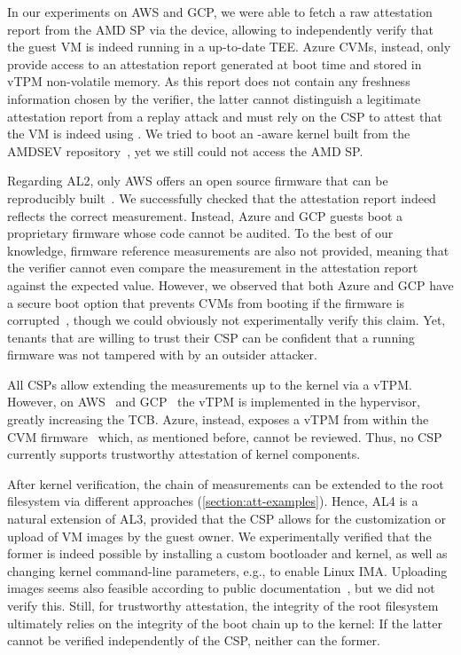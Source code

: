 In our experiments on \ac{AWS} and \ac{GCP}, we were able to fetch a raw
attestation report from the AMD \ac{SP} via the \sevguest{} device, allowing to
independently verify that the guest VM is indeed running in a up-to-date
\sevsnp{} \ac{TEE}. Azure \acp{CVM}, instead, only provide access to an
attestation report generated at boot time and stored in \ac{vTPM} non-volatile
memory. As this report does not contain any freshness information chosen by the
verifier, the latter cannot distinguish a legitimate attestation report from a
replay attack and must rely on the \ac{CSP} to attest that the VM is indeed
using \sevsnp. We tried to boot an \snp{}-aware kernel built from the AMDSEV
repository~\cite{amdsevGithub}, yet we still could not access the AMD \ac{SP}.

Regarding AL2, only \ac{AWS} offers an open source firmware that can be
reproducibly built~\cite{awsUefi}. We successfully checked that the attestation
report indeed reflects the correct measurement. Instead, Azure and \ac{GCP}
guests boot a proprietary firmware whose code cannot be audited. To the best of
our knowledge, firmware reference measurements are also not provided, meaning
that the verifier cannot even compare the measurement in the attestation report
against the expected value. However, we observed that both Azure and \ac{GCP}
have a secure boot option that prevents \acp{CVM} from booting if the firmware
is corrupted~\cite{azureDocsSecureBoot,googleDocsSecureBoot}, though we could
obviously not experimentally verify this claim. Yet, tenants that are willing to
trust their \ac{CSP} can be confident that a running firmware was not tampered
with by an outsider attacker.

All \acp{CSP} allow extending the measurements up to the kernel via a \ac{vTPM}.
However, on \ac{AWS}~\cite{awsGithubvTPM} and \ac{GCP}~\cite{googleDocsvTPM} the
\ac{vTPM} is implemented in the hypervisor, greatly increasing the \ac{TCB}.
Azure, instead, exposes a \ac{vTPM} from within the \ac{CVM}
firmware~\cite{azureDocsvTPM} which, as mentioned before, cannot be reviewed.
Thus, no \ac{CSP} currently supports trustworthy attestation of kernel
components.

After kernel verification, the chain of measurements can be extended to the root
filesystem via different approaches (\cref{section:att-examples}).  Hence, AL4
is a natural extension of AL3, provided that the \ac{CSP} allows for the
customization or upload of VM images by the guest owner. We experimentally
verified that the former is indeed possible by installing a custom bootloader
and kernel, as well as changing kernel command-line parameters, e.g., to enable
Linux \ac{IMA}. Uploading images seems also feasible according to public
documentation~\cite{awsDocsCustomImage,azureDocsCustomImage,googleDocsCustomImage},
but we did not verify this. Still, for trustworthy attestation, the integrity of
the root filesystem ultimately relies on the integrity of the boot chain up to
the kernel: If the latter cannot be verified independently of the \ac{CSP},
neither can the former.


